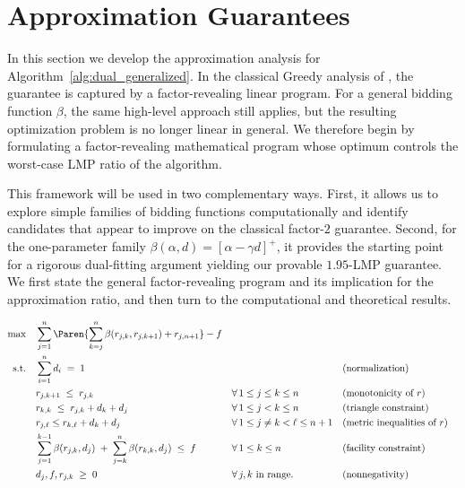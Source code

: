 \section{Approximation Guarantees}
\label{sec:approx_guarantee}
In this section we develop the approximation analysis for Algorithm~\ref{alg:dual_generalized}. In the classical Greedy analysis of \cite{JMS02,JainMMSV03}, the guarantee is captured by a factor-revealing linear program. For a general bidding function $\beta$, the same high-level approach still applies, but the resulting optimization problem is no longer linear in general. We therefore begin by formulating a factor-revealing mathematical program whose optimum controls the worst-case LMP ratio of the algorithm.

This framework will be used in two complementary ways. First, it allows us to explore simple families of bidding functions computationally and identify candidates that appear to improve on the classical factor-$2$ guarantee. Second, for the one-parameter family $\beta(\alpha,d)=[\alpha-\gamma d]^+$, it provides the starting point for a rigorous dual-fitting argument yielding our provable $1.95$-LMP guarantee. We first state the general factor-revealing program and its implication for the approximation ratio, and then turn to the computational and theoretical results.

\begin{definition}
\label{def:frp}
\begin{align}
\max \quad & \sum_{j=1}^n \Paren{\sum_{k=j}^{n} \beta(r_{j,k}, r_{j,k+1}) + r_{j,n+1}} - f
\label{eq:fr-obj}
\\
\text{s.t.}\quad 
& \sum_{i=1}^{n} d_i \;=\; 1
\qquad && && \text{(normalization)}
\label{eq:fr-norm}
\\
& r_{j,k+1} \;\le\; r_{j,k}
\qquad && \forall\, 1\le j \leq k \leq n && \text{(monotonicity of $r$)}
\label{eq:fr-r-mono}
\\
& r_{k,k} \;\le\; r_{j,k} + d_k + d_j
\qquad && \forall\, 1\le j<k\le n && \text{(triangle constraint)}
\label{eq:fr-triangle}
\\
& r_{j, \ell} \leq r_{k, \ell} + d_k + d_j && \forall\, 1 \leq j \neq k < \ell \leq n + 1 && \text{(metric inequalities of $r$)}
\label{eq:fr-r-metric}
\\
& \sum_{j=1}^{k-1} \beta(r_{j,k},d_j)
  \;+\;
  \sum_{j=k}^{n} \beta(r_{k,k},d_j)
  \;\le\; f
\qquad && \forall\, 1\le k\le n && \text{(facility constraint)}
\label{eq:fr-facility}
\\
& d_j, f, r_{j,k} \;\ge\; 0
\qquad && \forall\, j,k \text{ in range.} && \text{(nonnegativity)}
\label{eq:fr-nonneg}
\end{align}
\end{definition}

